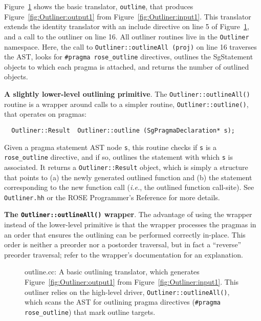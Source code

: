 Figure~\ref{fig:Outliner:basic} shows the basic translator,
\texttt{outline}, that produces Figure~\ref{fig:Outliner:output1}
from Figure~\ref{fig:Outliner:input1}. This translator extends the
identity translator with an include directive on line 5 of
Figure~\ref{fig:Outliner:basic}, and a call to the outliner on
line 16. All outliner routines live in the \texttt{Outliner}
namespace. Here, the call to \texttt{Outliner::outlineAll (proj)}
on line 16 traverses the AST, looks for \texttt{\#pragma
rose\_outline} directives, outlines the SgStatement objects to which
each pragma is attached, and returns the number of outlined objects.

\textbf{A slightly lower-level outlining primitive}. The
\texttt{Outliner::outlineAll()} routine is a wrapper around calls
to a simpler routine, \texttt{Outliner::outline()}, that operates
on pragmas:
%
\begin{lstlisting}
  Outliner::Result  Outliner::outline (SgPragmaDeclaration* s);
\end{lstlisting}
%
Given a pragma statement AST node \texttt{s}, this routine checks if
\texttt{s} is a \texttt{rose\_outline} directive, and if so, outlines
the statement with which \texttt{s} is associated. It returns a
\texttt{Outliner::Result} object, which is simply a structure that
points to (a) the newly generated outlined function and (b) the
statement corresponding to the new function call (\emph{i.e.}, the
outlined function call-site). See \texttt{Outliner.hh} or the ROSE
Programmer's Reference for more details.

\textbf{The \texttt{Outliner::outlineAll()} wrapper}. The advantage
of using the wrapper instead of the lower-level primitive is that the
wrapper processes the pragmas in an order that ensures the outlining
can be performed correctly in-place. This order is neither a preorder
nor a postorder traversal, but in fact a ``reverse'' preorder
traversal; refer to the wrapper's documentation for an explanation.

\begin{figure}[!h]
{\indent
{\mySmallFontSize
\begin{latexonly}
   
\end{latexonly}
\begin{htmlonly}
   
\end{htmlonly}

}
}
\caption{outline.cc: A basic outlining translator, which generates
Figure~\ref{fig:Outliner:output1} from
Figure~\ref{fig:Outliner:input1}. This outliner relies on the
high-level driver, \texttt{Outliner::outlineAll()}, which scans the
AST for outlining pragma directives (\texttt{\#pragma rose\_outline})
that mark outline targets.}
\label{fig:Outliner:basic}
\end{figure}

